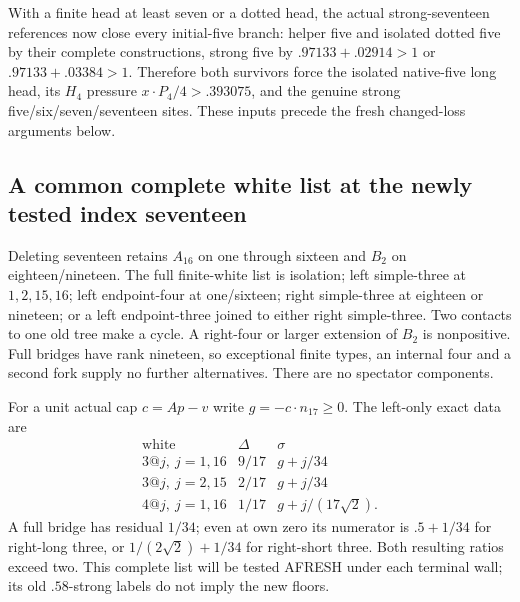 \documentclass[11pt]{article}
\theoremstyle{definition}
\theoremstyle{remark}
\begin{document}
With a finite head at least seven
or a dotted head, the actual
strong-seventeen references now
close every initial-five branch:
helper five and isolated dotted
five by their complete constructions,
strong five by
\(.97133+.02914>1\) or
\(.97133+.03384>1\).
Therefore both survivors force
the isolated native-five long head,
its \(H_4\) pressure
\(x\cdot P_4/4>.393075\),
and the genuine strong
five/six/seven/seventeen sites.
These inputs precede the fresh
changed-loss arguments below.


\subsection{A common complete white list at the newly tested index seventeen}
\label{app:exact19:Bchangedlist}

Deleting seventeen retains \(A_{16}\)
on one through sixteen and \(B_2\)
on eighteen/nineteen.
The full finite-white list is
isolation; left simple-three at
\(1,2,15,16\); left endpoint-four
at one/sixteen; right simple-three
at eighteen or nineteen; or a
left endpoint-three joined to
either right simple-three.
Two contacts to one old tree
make a cycle.
A right-four or larger extension
of \(B_2\) is nonpositive.
Full bridges have rank nineteen,
so exceptional finite types,
an internal four and a second
fork supply no further alternatives.
There are no spectator components.

For a unit actual cap \(c=Ap-v\)
write \(g=-c\cdot n_{17}\ge0\).
The left-only exact data are
\[
\begin{array}{c|c|c}
 \text{white}&\Delta&\sigma\\ \hline
 3@j,\ j=1,16&9/17&g+j/34\\
 3@j,\ j=2,15&2/17&g+j/34\\
 4@j,\ j=1,16&1/17&g+j/(17\sqrt2).
\end{array}
\]
A full bridge has residual \(1/34\);
even at own zero its numerator
is \(.5+1/34\) for right-long
three, or \(1/(2\sqrt2)+1/34\)
for right-short three.
Both resulting ratios exceed two.
This complete list will be tested
AFRESH under each terminal wall;
its old \(.58\)-strong labels
do not imply the new floors.
\end{document}
